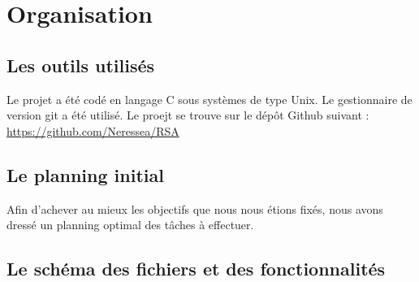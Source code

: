 \section{Organisation}

\subsection{Les outils utilisés}

Le projet a été codé en langage C sous systèmes de type Unix. Le gestionnaire de version git a été utilisé. Le proejt se trouve sur le dépôt Github suivant : \url{https://github.com/Neressea/RSA}

\subsection{Le planning initial}

Afin d'achever au mieux les objectifs que nous nous étions fixés, nous avons dressé un planning optimal des tâches à effectuer.

\subsection{Le schéma des fichiers et des fonctionnalités}


